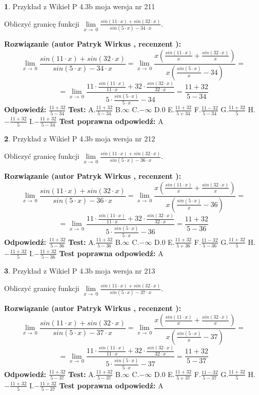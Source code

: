 \documentclass[12pt, a4paper]{article}
\theoremstyle{definition} %
\newtheorem{zad}{}
\newcommand{\zadStart}[1]{\begin{zad}#1\newline}
\newcommand{\zadStop}{\end{zad}}
\newcommand{\rozwStart}[2]{\noindent \textbf{Rozwiązanie (autor #1 , recenzent #2): }\newline}
\newcommand{\rozwStop}{\newline}
\newcommand{\odpStart}{\noindent \textbf{Odpowiedź:}\newline}
\newcommand{\odpStop}{\newline}
\newcommand{\testStart}{\noindent \textbf{Test:}\newline}
\newcommand{\testStop}{\newline}
\newcommand{\kluczStart}{\noindent \textbf{Test poprawna odpowiedź:}\newline}
\newcommand{\kluczStop}{\newline}
\begin{document}
\zadStart{Przykład z Wikieł P 4.3b moja wersja nr 211}


Obliczyć granicę funkcji $\lim\limits_{x\to\ 0}\frac{sin(11 \cdot x)+sin(32 \cdot x)}{sin(5 \cdot x)-34 \cdot x}$.
\zadStop
\rozwStart{Patryk Wirkus}{}
$$\lim\limits_{x\to\ 0}\frac{sin(11 \cdot x)+sin(32 \cdot x)}{sin(5 \cdot x)-34 \cdot x}=\lim\limits_{x\to\ 0}\frac{x(\frac{sin(11 \cdot x)}{x}+\frac{sin(32 \cdot x)}{x})}{x(\frac{sin(5 \cdot x)}{x}-34)}=$$
$$=\lim\limits_{x\to\ 0}\frac{11 \cdot \frac{sin(11 \cdot x)}{11 \cdot x}+32 \cdot \frac{sin(32 \cdot x)}{32 \cdot x}}{5 \cdot \frac{sin(5 \cdot x)}{5 \cdot x}-34}=\frac{11+32}{5-34}$$
\rozwStop
\odpStart
$\frac{11+32}{5-34}$
\odpStop
\testStart
A.$\frac{11+32}{5-34}$
B.$\infty$
C.$-\infty$
D.$0$
E.$\frac{11+32}{5+34}$
F.$\frac{11-32}{5-34}$
G.$\frac{11+32}{5}$
H.$-\frac{11+32}{5}$
I.$-\frac{11+32}{5-34}$
\testStop
\kluczStart
A
\kluczStop



\zadStart{Przykład z Wikieł P 4.3b moja wersja nr 212}


Obliczyć granicę funkcji $\lim\limits_{x\to\ 0}\frac{sin(11 \cdot x)+sin(32 \cdot x)}{sin(5 \cdot x)-36 \cdot x}$.
\zadStop
\rozwStart{Patryk Wirkus}{}
$$\lim\limits_{x\to\ 0}\frac{sin(11 \cdot x)+sin(32 \cdot x)}{sin(5 \cdot x)-36 \cdot x}=\lim\limits_{x\to\ 0}\frac{x(\frac{sin(11 \cdot x)}{x}+\frac{sin(32 \cdot x)}{x})}{x(\frac{sin(5 \cdot x)}{x}-36)}=$$
$$=\lim\limits_{x\to\ 0}\frac{11 \cdot \frac{sin(11 \cdot x)}{11 \cdot x}+32 \cdot \frac{sin(32 \cdot x)}{32 \cdot x}}{5 \cdot \frac{sin(5 \cdot x)}{5 \cdot x}-36}=\frac{11+32}{5-36}$$
\rozwStop
\odpStart
$\frac{11+32}{5-36}$
\odpStop
\testStart
A.$\frac{11+32}{5-36}$
B.$\infty$
C.$-\infty$
D.$0$
E.$\frac{11+32}{5+36}$
F.$\frac{11-32}{5-36}$
G.$\frac{11+32}{5}$
H.$-\frac{11+32}{5}$
I.$-\frac{11+32}{5-36}$
\testStop
\kluczStart
A
\kluczStop



\zadStart{Przykład z Wikieł P 4.3b moja wersja nr 213}


Obliczyć granicę funkcji $\lim\limits_{x\to\ 0}\frac{sin(11 \cdot x)+sin(32 \cdot x)}{sin(5 \cdot x)-37 \cdot x}$.
\zadStop
\rozwStart{Patryk Wirkus}{}
$$\lim\limits_{x\to\ 0}\frac{sin(11 \cdot x)+sin(32 \cdot x)}{sin(5 \cdot x)-37 \cdot x}=\lim\limits_{x\to\ 0}\frac{x(\frac{sin(11 \cdot x)}{x}+\frac{sin(32 \cdot x)}{x})}{x(\frac{sin(5 \cdot x)}{x}-37)}=$$
$$=\lim\limits_{x\to\ 0}\frac{11 \cdot \frac{sin(11 \cdot x)}{11 \cdot x}+32 \cdot \frac{sin(32 \cdot x)}{32 \cdot x}}{5 \cdot \frac{sin(5 \cdot x)}{5 \cdot x}-37}=\frac{11+32}{5-37}$$
\rozwStop
\odpStart
$\frac{11+32}{5-37}$
\odpStop
\testStart
A.$\frac{11+32}{5-37}$
B.$\infty$
C.$-\infty$
D.$0$
E.$\frac{11+32}{5+37}$
F.$\frac{11-32}{5-37}$
G.$\frac{11+32}{5}$
H.$-\frac{11+32}{5}$
I.$-\frac{11+32}{5-37}$
\testStop
\kluczStart
A
\kluczStop
\end{document}
